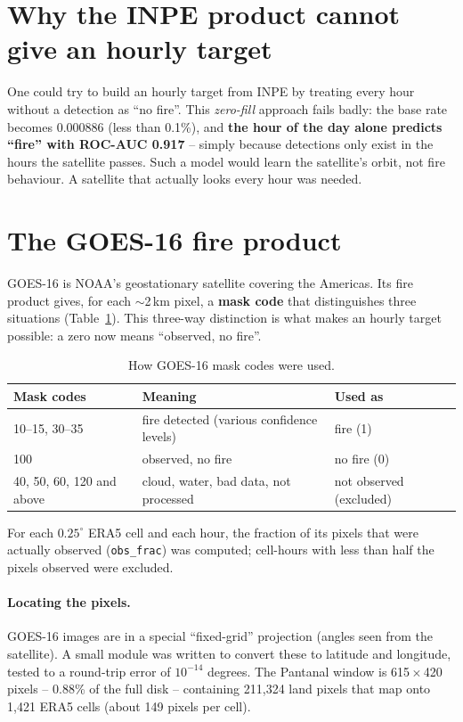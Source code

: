 \documentclass[11pt,a4paper,oneside]{report}
\newcommand{\code}[1]{\texttt{\small #1}}
\begin{document}
\section{Why the INPE product cannot give an hourly target}

One could try to build an hourly target from INPE by treating every hour without
a detection as \enquote{no fire}. This \emph{zero-fill} approach fails badly: the
base rate becomes 0.000886 (less than 0.1\%), and \textbf{the hour of the day
alone predicts \enquote{fire} with ROC-AUC 0.917} -- simply because detections
only exist in the hours the satellite passes. Such a model would learn the
satellite's orbit, not fire behaviour. A satellite that actually looks every hour
was needed.

\section{The GOES-16 fire product}\label{sec:goes-product}

GOES-16 is NOAA's geostationary satellite covering the Americas. Its fire product
gives, for each $\sim$2\,km pixel, a \textbf{mask code} that distinguishes three
situations (Table~\ref{tab:mask}). This three-way distinction is what makes an
hourly target possible: a zero now means \enquote{observed, no fire}.

\begin{table}[H]
\centering\small
\caption{How GOES-16 mask codes were used.}
\label{tab:mask}
\begin{tabular}{lll}
\toprule
Mask codes & Meaning & Used as \\
\midrule
10--15, 30--35 & fire detected (various confidence levels) & fire (1) \\
100 & observed, no fire & no fire (0) \\
40, 50, 60, 120 and above & cloud, water, bad data, not processed & not observed (excluded) \\
\bottomrule
\end{tabular}
\end{table}

For each $0.25^\circ$ ERA5 cell and each hour, the fraction of its pixels that
were actually observed (\code{obs\_frac}) was computed; cell-hours with less than
half the pixels observed were excluded.

\paragraph{Locating the pixels.} GOES-16 images are in a special
\enquote{fixed-grid} projection (angles seen from the satellite). A small module
was written to convert these to latitude and longitude, tested to a round-trip
error of $10^{-14}$ degrees. The Pantanal window is 615\,$\times$\,420 pixels --
0.88\% of the full disk -- containing 211{,}324 land pixels that map onto 1{,}421
ERA5 cells (about 149 pixels per cell).
\end{document}
